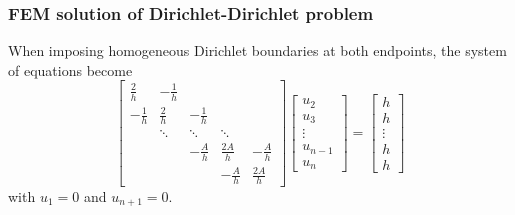 \documentclass[12pt]{article}
\begin{document}
\subsubsection{FEM solution of Dirichlet-Dirichlet problem}
When imposing homogeneous Dirichlet boundaries at both endpoints, the system of equations become
\[
\begin{bmatrix}
\frac{2}{h} & -\frac{1}{h} \\
-\frac{1}{h} & \frac{2}{h} & -\frac{1}{h} \\
& \ddots & \ddots & \ddots \\
&& -\frac{A}{h} & \frac{2A}{h} & -\frac{A}{h} \\
&&& -\frac{A}{h} & \frac{2A}{h}
\end{bmatrix}
\begin{bmatrix}
u_{2} \\
u_{3} \\
\vdots \\
u_{n-1} \\
u_{n}
\end{bmatrix}
=
\begin{bmatrix}
h \\
h \\
\vdots \\
h \\
h
\end{bmatrix}
\]
with $u_{1}=0$ and $u_{n+1}=0$.
\end{document}
